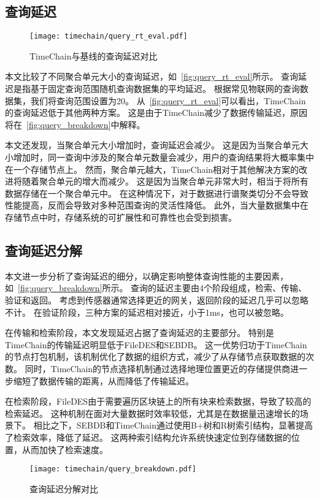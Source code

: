 \subsection{查询延迟}
\begin{figure}[t]
    \centering
    \texttt{[image: timechain/query\_rt\_eval.pdf]}
    \caption{TimeChain与基线的查询延迟对比}
    \label{fig:query_rt_eval}
\end{figure}
本文比较了不同聚合单元大小的查询延迟，如~\autoref{fig:query_rt_eval}所示。
查询延迟是指基于固定查询范围随机查询数据集的平均延迟。
根据常见物联网的查询数据集，我们将查询范围设置为20。
从~\autoref{fig:query_rt_eval}可以看出，TimeChain的查询延迟低于其他两种方案。
这是由于TimeChain减少了数据传输延迟，原因将在~\autoref{fig:query_breakdown}中解释。

本文还发现，当聚合单元大小增加时，查询延迟会减少。
这是因为当聚合单元大小增加时，同一查询中涉及的聚合单元数量会减少，用户的查询结果将大概率集中在一个存储节点上。
然而，聚合单元越大，TimeChain相对于其他解决方案的改进将随着聚合单元的增大而减少。
这是因为当聚合单元非常大时，相当于将所有数据存储在一个聚合单元中。
在这种情况下，对于数据进行谱聚类切分不会导致性能提高，反而会导致对多种范围查询的灵活性降低。
此外，当大量数据集中在存储节点中时，存储系统的可扩展性和可靠性也会受到损害。

\subsection{查询延迟分解}
本文进一步分析了查询延迟的细分，以确定影响整体查询性能的主要因素，如~\autoref{fig:query_breakdown}所示。
查询的延迟主要由4个阶段组成，检索、传输、验证和返回。
考虑到传感器通常选择更近的网关，返回阶段的延迟几乎可以忽略不计。
在验证阶段，三种方案的延迟相对接近，小于1ms，也可以被忽略。

在传输和检索阶段，本文发现延迟占据了查询延迟的主要部分。
特别是TimeChain的传输延迟明显低于FileDES和SEBDB。
这一优势归功于TimeChain的节点打包机制，该机制优化了数据的组织方式，减少了从存储节点获取数据的次数。
同时，TimeChain的节点选择机制通过选择地理位置更近的存储提供商进一步缩短了数据传输的距离，从而降低了传输延迟。

在检索阶段，FileDES由于需要遍历区块链上的所有块来检索数据，导致了较高的检索延迟。
这种机制在面对大量数据时效率较低，尤其是在数据量迅速增长的场景下。
相比之下，SEBDB和TimeChain通过使用B+树和R树索引结构，显著提高了检索效率，降低了延迟。
这两种索引结构允许系统快速定位到存储数据的位置，从而加快了检索速度。
\begin{figure}[t]
    \centering
    \texttt{[image: timechain/query\_breakdown.pdf]}
    \caption{查询延迟分解对比}
    \label{fig:query_breakdown}
\end{figure}

